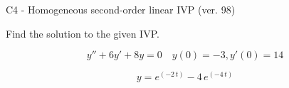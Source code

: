 \begin{exercise}
  \begin{exerciseTitle}C4 - Homogeneous second-order linear IVP (ver. 98)\end{exerciseTitle}
  \begin{exerciseStatement}
    
Find the solution to the given IVP.

    
\[y''+6y'+8y = 0 \hspace{1em} y(0) = -3 , y'(0) = 14\]

  \end{exerciseStatement}
  \begin{exerciseAnswer}
    
\[y= e^{\left(-2 \, t\right)} - 4 \, e^{\left(-4 \, t\right)}\]

  \end{exerciseAnswer}
\end{exercise}